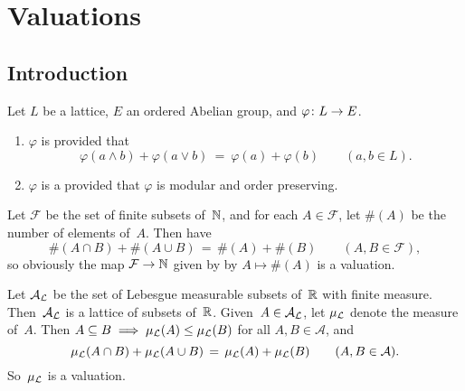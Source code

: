 \documentclass[main.tex]{subfiles}
\begin{document}
\section{Valuations}
\label{S:vals}
\subsection{Introduction}
\noindent
%
%
\begin{dfn}
\label{D:val}
Let $L$ be a lattice, $E$ an ordered Abelian group,
and $\varphi\colon L \rightarrow E$.
\begin{enumerate}
\item
\label{D:val-mod}
$\varphi$ is  provided that
\begin{equation*}
\varphi(a\wedge b) + \varphi(a \vee b)
\ =\ 
\varphi(a) + \varphi(b)
\qquad(a,b\in L).
\end{equation*}

\item
\label{D:val-val}
$\varphi$ is a 
provided that $\varphi$ is modular and order preserving.
\end{enumerate}
\end{dfn}

\begin{ex}
Let $\mathcal{F}$ be the set of finite subsets of~$\mathbb{N}$,
and for each $A\in \mathcal{F}$,
let $\#(A)$ be the number of elements of~$A$.
Then have 
\begin{equation*}
\#(A\cap B) + \#(A\cup B) \,=\, \#(A) + \#(B)
\qquad(A,B\in\mathcal{F}),
\end{equation*}
so obviously the map $\mathcal{F} \rightarrow \mathbb{N}$
given by by $A\mapsto \#(A)$ is a valuation.
\end{ex}

%
%
\begin{ex}
\label{E:lmeas-val}
Let $\mathcal{A}_{\mathcal{L}}$ be the set of Lebesgue measurable
subsets of~$\mathbb{R}$ with finite measure.
Then~$\mathcal{A}_{\mathcal{L}}$ is a lattice of subsets of~$\mathbb{R}$.
Given~$A\in\mathcal{A}_{\mathcal{L}}$,
let $\mu_{\mathcal{L}}$ denote the measure of~$A$.
Then $A\subseteq B \implies \mu_{\mathcal{L}}(A)\leq \mu_{\mathcal{L}} (B)$
for all $A,B\in \mathcal{A}$,
and 
\begin{equation*}
\mu_{\mathcal{L}}(A\cap B) + \mu_{\mathcal{L}}(A\cup B) \,=\, \mu_{\mathcal{L}}(A) + \mu_{\mathcal{L}}(B)
\qquad(A,B\in\mathcal{A}).
\end{equation*}
So~$\mu_{\mathcal{L}}$ is a valuation.
\end{ex}
\end{document}
